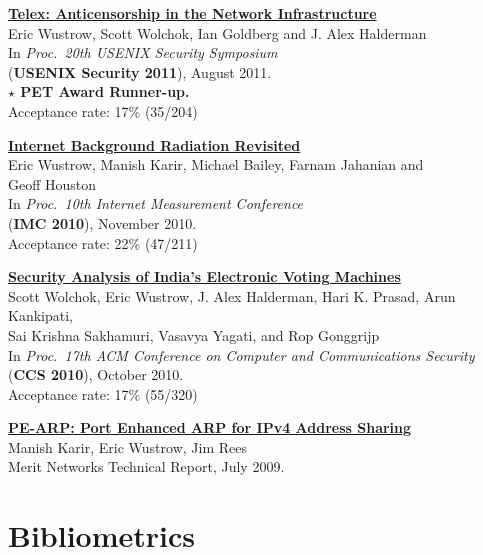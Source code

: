 \documentclass[margin,11pt]{res} %
\begin{document}
    \textbf{\href{https://telex.cc/pub/telex-usenixsec11.pdf}{Telex: Anticensorship in the Network Infrastructure}} \\
    Eric Wustrow, Scott Wolchok, Ian Goldberg and J. Alex Halderman \\
    In \emph{Proc.\ 20th USENIX Security Symposium} \\
    (\textbf{USENIX Security 2011}), August 2011. \\
    \textbf{$\star$ PET Award Runner-up.} \\
    Acceptance rate: 17\% (35/204)

    \textbf{\href{https://ericw.us/trow/imc10-wustrow.pdf}{Internet Background Radiation Revisited}} \\
        Eric Wustrow, Manish Karir, Michael Bailey, Farnam Jahanian and\\ Geoff Houston \\
        In \emph{Proc.\ 10th Internet Measurement Conference} \\
        (\textbf{IMC 2010}), November 2010.\\
        Acceptance rate: 22\% (47/211)

    \textbf{\href{http://www.cse.umich.edu/~jhalderm/pub/papers/evm-ccs10.pdf}{Security Analysis of India's Electronic Voting  Machines}} \\ 
        Scott Wolchok, Eric Wustrow, J. Alex Halderman, Hari K. Prasad, Arun Kankipati, \\
        Sai Krishna Sakhamuri, Vasavya Yagati, and Rop Gonggrijp \\
        In \emph{Proc.\ 17th ACM Conference on Computer and Communications Security} \\
        (\textbf{CCS 2010}), October 2010. \\
        Acceptance rate: 17\% (55/320)

    \textbf{\href{https://ericw.us/trow/pe-arp.pdf}{PE-ARP: Port Enhanced ARP for IPv4 Address Sharing}} \\
        Manish Karir, Eric Wustrow, Jim Rees \\
        Merit Networks Technical Report, July 2009.

\vspace{6pt}
\section{\large Bibliometrics}
\end{document}
